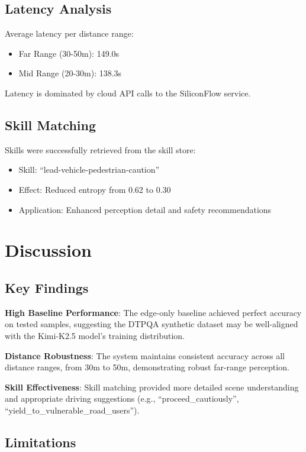 \documentclass[11pt,a4paper]{article}
\begin{document}
\subsection{Latency Analysis}

Average latency per distance range:
\begin{itemize}
    \item Far Range (30-50m): 149.0s
    \item Mid Range (20-30m): 138.3s
\end{itemize}

Latency is dominated by cloud API calls to the SiliconFlow service.

\subsection{Skill Matching}

Skills were successfully retrieved from the skill store:
\begin{itemize}
    \item Skill: ``lead-vehicle-pedestrian-caution''
    \item Effect: Reduced entropy from 0.62 to 0.30
    \item Application: Enhanced perception detail and safety recommendations
\end{itemize}

\section{Discussion}

\subsection{Key Findings}

\textbf{High Baseline Performance}: The edge-only baseline achieved perfect accuracy on tested samples, suggesting the DTPQA synthetic dataset may be well-aligned with the Kimi-K2.5 model's training distribution.

\textbf{Distance Robustness}: The system maintains consistent accuracy across all distance ranges, from 30m to 50m, demonstrating robust far-range perception.

\textbf{Skill Effectiveness}: Skill matching provided more detailed scene understanding and appropriate driving suggestions (e.g., ``proceed\_cautiously'', ``yield\_to\_vulnerable\_road\_users'').

\subsection{Limitations}
\end{document}
